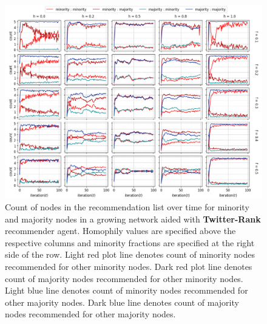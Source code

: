 \begin{appendices}
\begin{figure}[h!]
	\centering
	\includegraphics[width=1.0\textwidth]{images/count_tr.png}
	\caption{Count of nodes in the recommendation list over time for minority and majority nodes in a growing network aided with \textbf{Twitter-Rank} recommender agent. Homophily values are specified above the respective columns and minority fractions are specified at the right side of the row. Light red plot line denotes count of minority nodes recommended for other minority nodes. Dark red plot line denotes count of majority nodes recommended for other minority nodes. Light blue line denotes count of minority nodes recommended for other majority nodes. Dark blue line denotes count of majority nodes recommended for other majority nodes.}
	\label{count_tr}
\end{figure}



\end{appendices}
